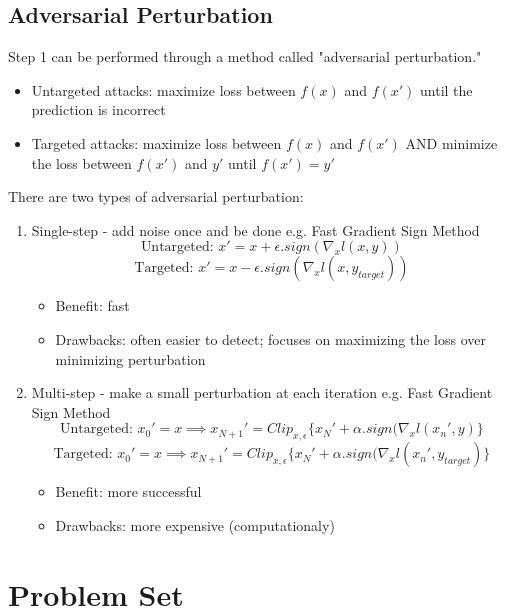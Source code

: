 \documentclass{article}
\begin{document}
\subsection{Adversarial Perturbation}
Step 1 can be performed through a method called "adversarial perturbation." 
\begin{itemize}
    \item Untargeted attacks: maximize loss between $f(x)$ and $f(x')$ until the prediction is incorrect
    \item Targeted attacks: maximize loss between $f(x)$ and $f(x')$ AND minimize the loss between $f(x')$ and $y'$ until $f(x') = y'$
\end{itemize}

There are two types of adversarial perturbation:
\begin{enumerate}
    \item Single-step - add noise once and be done
e.g. Fast Gradient Sign Method
$$\text{Untargeted: }x' = x + \epsilon.sign(\nabla_xl(x,y))$$
$$\text{Targeted: }x' = x - \epsilon.sign(\nabla_xl(x,y_{target}))$$
\begin{itemize}
    \item Benefit: fast
    \item Drawbacks: often easier to detect; focuses on maximizing the loss over minimizing perturbation
\end{itemize}
\item Multi-step - make a small perturbation at each iteration
e.g. Fast Gradient Sign Method
$$\text{Untargeted: }x_0' = x \implies x_{N+1}' = Clip_{x,\epsilon}\{x_N' + \alpha.sign(\nabla_xl(x_n', y)\} $$
$$\text{Targeted: }x_0' = x \implies x_{N+1}' = Clip_{x,\epsilon}\{x_N' + \alpha.sign(\nabla_xl(x_n', y_{target})\} $$
\begin{itemize}
    \item Benefit: more successful
    \item Drawbacks: more expensive (computationaly)
\end{itemize}
\end{enumerate}

\section{Problem Set}
\end{document}
